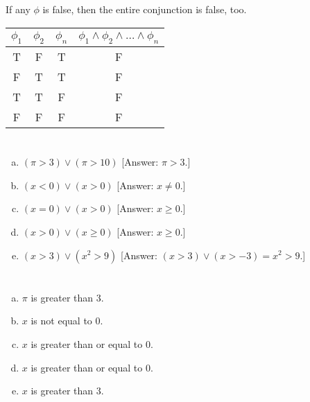 \documentclass{article}
\begin{document}
\section{}

If any $\phi$ is false, then the entire conjunction is false, too.

\begin{tabular}{ | c | c | c | c | }
  \hline
  $\phi_1$ & $\phi_2$ & $\phi_n$ & $\phi_1 \wedge \phi_2 \wedge \dots \wedge \phi_n$ \\
  \hline
  T & F & T & F \\
  F & T & T & F \\
  T & T & F & F \\
  F & F & F & F \\
  \hline
\end{tabular}

\section{}

\begin{enumerate}[(a)]
\item $(\pi > 3) \vee (\pi > 10)$ [Answer: $\pi > 3$.]
\item $(x < 0) \vee (x > 0)$ [Answer: $x \neq 0$.]
\item $(x = 0) \vee (x > 0)$ [Answer: $x \geq 0$.]
\item $(x > 0) \vee (x \geq 0)$ [Answer: $x \geq 0$.]
\item $(x > 3) \vee (x^2 > 9)$ [Answer: $(x > 3) \vee (x > -3) = x^2 > 9$.]
\end{enumerate}

\section{}

\begin{enumerate}[(a)]
\item $\pi$ is greater than 3.
\item $x$ is not equal to 0.
\item $x$ is greater than or equal to 0.
\item $x$ is greater than or equal to 0.
\item $x$ is greater than 3.
\end{enumerate}

\section{}
\end{document}
